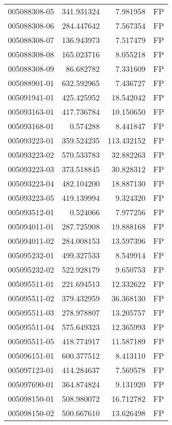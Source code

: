 \begin{tabular}{lrrl}
005088308-05 &  341.931324 &     7.981958 &   FP \\
005088308-06 &  284.447642 &     7.567354 &   FP \\
005088308-07 &  136.943973 &     7.517479 &   FP \\
005088308-08 &  165.023716 &     8.055218 &   FP \\
005088308-09 &   86.682782 &     7.331609 &   FP \\
005088901-01 &  632.592965 &     7.436727 &   FP \\
005091941-01 &  425.425952 &    18.542042 &   FP \\
005093163-01 &  417.736784 &    10.150650 &   FP \\
005093168-01 &    0.574288 &     8.441847 &   FP \\
005093223-01 &  359.524235 &   113.432152 &   FP \\
005093223-02 &  570.533783 &    32.882263 &   FP \\
005093223-03 &  373.518845 &    30.828312 &   FP \\
005093223-04 &  482.104200 &    18.887130 &   FP \\
005093223-05 &  419.139994 &     9.324320 &   FP \\
005093512-01 &    0.524066 &     7.977256 &   FP \\
005094011-01 &  287.725908 &    19.888168 &   FP \\
005094011-02 &  284.008153 &    13.597396 &   FP \\
005095232-01 &  499.327533 &     8.549914 &   FP \\
005095232-02 &  522.928179 &     9.650753 &   FP \\
005095511-01 &  221.694513 &    12.332622 &   FP \\
005095511-02 &  379.432959 &    36.368130 &   FP \\
005095511-03 &  278.978807 &    13.205757 &   FP \\
005095511-04 &  575.649323 &    12.365993 &   FP \\
005095511-05 &  418.774917 &    11.587189 &   FP \\
005096151-01 &  600.377512 &     8.413110 &   FP \\
005097123-01 &  414.284637 &     7.569578 &   FP \\
005097690-01 &  364.874824 &     9.131920 &   FP \\
005098150-01 &  508.980072 &    16.712782 &   FP \\
005098150-02 &  500.667610 &    13.626498 &   FP \\

\end{tabular}
